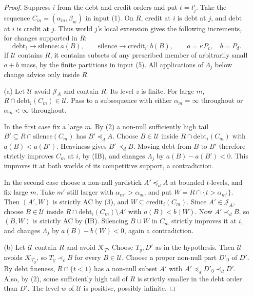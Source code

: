 \documentclass[11pt]{article}
\theoremstyle{remark}\newtheorem{remark}[theorem]{Remark}
\newcommand{\cred}{\mathrm{credit}}
\newcommand{\debt}{\mathrm{debt}}
\newcommand{\J}{\mathcal J}
\newcommand{\K}{\mathcal K}
\newcommand{\U}{\mathcal U}
\begin{document}
\begin{proof}
Suppress $i$ from the debt and credit orders and put $t=t^i_j$.
Take the sequence $C_m=(\alpha_m,\beta_m)$ in input (1).
On $R$, credit at $i$ is debt at $j$, and debt at $i$ is credit at $j$.
Thus world $j$'s local extension gives the following increments, for
changes supported in $R$:
\[
 \debt_i\to\text{silence}:a(B),\qquad
 \text{silence}\to\cred_i:b(B),\qquad a=\kappa P_c,\quad b=P_d.
\]
If $\U$ contains $R$, it contains subsets of any prescribed member of
arbitrarily small $a+b$ mass, by the finite partitions in input (5).
All applications of $\Lambda_j$ below change advice only inside $R$.

(a) Let $\U$ avoid $\J_A$ and contain $R$. Its level $z$ is finite.
For large $m$, $R\cap\debt_i(C_m)\in\U$. Pass to a subsequence with
either $\alpha_m=\infty$ throughout or $\alpha_m<\infty$ throughout.

In the first case fix a large $m$. By (2) a non-null sufficiently high
tail $B'\subseteq R\cap\text{silence}(C_m)$ has $B'\preceq_d A$.
Choose $B\in\U$ inside $R\cap\debt_i(C_m)$ with $a(B)<a(B')$.
Heaviness gives $B'\prec_d B$. Moving debt from $B$ to $B'$ therefore
strictly improves $C_m$ at $i$, by (IB), and changes $\Lambda_j$ by
$a(B)-a(B')<0$. This improves it at both worlds of its competitive
support, a contradiction.

In the second case choose a non-null yardstick $A'\preceq_d A$ at
bounded $t$-levels, and fix large $m$. Take $m'$ still larger with
$\alpha_{m'}>\alpha_m$, and put $W=R\cap\{t>\alpha_{m'}\}$.
Then $(A',W)$ is strictly AC by (3), and $W\subseteq\cred_i(C_m)$.
Since $A'\in\J_A$, choose $B\in\U$ inside
$R\cap\debt_i(C_m)\setminus A'$ with $a(B)<b(W)$.
Now $A'\prec_d B$, so $(B,W)$ is strictly AC by (IB).
Silencing $B\cup W$ in $C_m$ strictly improves it at $i$, and changes
$\Lambda_j$ by $a(B)-b(W)<0$, again a contradiction.

(b) Let $\U$ contain $R$ and avoid $\K_T$. Choose $T_y,D'$ as in the
hypothesis. Then $\U$ avoids $\K_{T_y}$, so $T_y\prec_c B$ for every
$B\in\U$. Choose a proper non-null part $D'_0$ of $D'$.
By debt fineness, $R\cap\{t<1\}$ has a non-null subset $A'$ with
$A'\preceq_dD'_0\prec_dD'$. Also, by (2), some sufficiently high tail
of $R$ is strictly smaller in the debt order than $D'$.
The level $w$ of $\U$ is positive, possibly infinite.


\end{proof}
\end{document}
